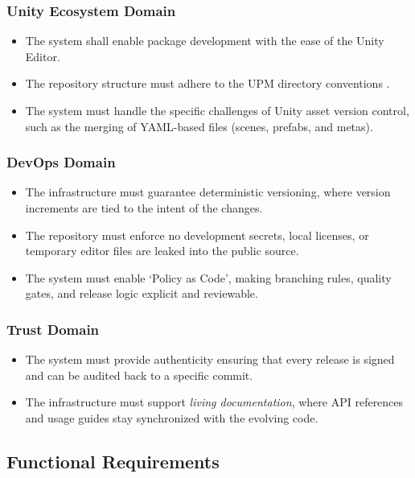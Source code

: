 \subsubsection{Unity Ecosystem Domain}

\begin{itemize}
	\item The system shall enable package development with the ease of the Unity Editor.
	\item The repository structure must adhere to the \ac{UPM} directory conventions \cite{unity_manual_package_types_2026}.
	\item The system must handle the specific challenges of Unity asset version control, such as the merging of YAML-based files (scenes, prefabs, and metas).
\end{itemize}

\subsubsection{DevOps Domain}

\begin{itemize}
	\item The infrastructure must guarantee deterministic versioning, where version increments are tied to the intent of the changes.
	\item The repository must enforce no development secrets, local licenses, or temporary editor files are leaked into the public source.
	\item The system must enable `Policy as Code', making branching rules, quality gates, and release logic explicit and reviewable.
\end{itemize}

\subsubsection{Trust Domain}

\begin{itemize}
	\item The system must provide authenticity ensuring that every release is signed and can be audited back to a specific commit.
	\item The infrastructure must support \textit{living documentation}, where \ac{API} references and usage guides stay synchronized with the evolving code.
\end{itemize}

\subsection{Functional Requirements}

